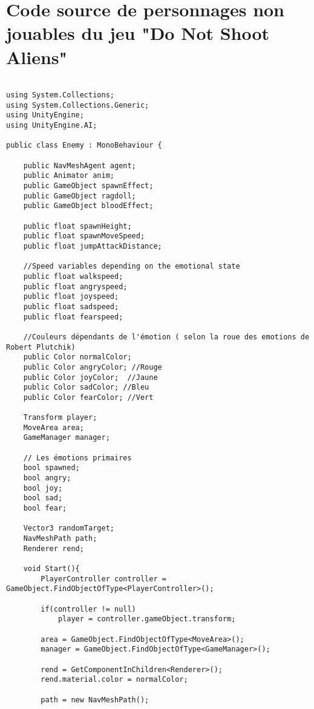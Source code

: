 
\chapter{Code source de personnages non jouables du jeu "Do Not Shoot Aliens"} %

\label{AppendixA} %


\begin{lstlisting}[language=Csh]

using System.Collections;
using System.Collections.Generic;
using UnityEngine;
using UnityEngine.AI;

public class Enemy : MonoBehaviour {
    
	public NavMeshAgent agent;
	public Animator anim;
	public GameObject spawnEffect;
	public GameObject ragdoll;
	public GameObject bloodEffect;
	
	public float spawnHeight;
	public float spawnMoveSpeed;
	public float jumpAttackDistance;

    //Speed variables depending on the emotional state
    public float walkspeed;
    public float angryspeed;
    public float joyspeed;
    public float sadspeed;
    public float fearspeed;

    //Couleurs dépendants de l'émotion ( selon la roue des emotions de Robert Plutchik)
    public Color normalColor;
    public Color angryColor; //Rouge
    public Color joyColor;  //Jaune
    public Color sadColor; //Bleu
    public Color fearColor; //Vert

    Transform player;
	MoveArea area;
	GameManager manager;

    // Les émotions primaires 
    bool spawned;
    bool angry;
    bool joy;
    bool sad;
    bool fear;

    Vector3 randomTarget;
	NavMeshPath path;
	Renderer rend;
	
	void Start(){
		PlayerController controller = GameObject.FindObjectOfType<PlayerController>();
		
		if(controller != null)
			player = controller.gameObject.transform;
		
		area = GameObject.FindObjectOfType<MoveArea>();
		manager = GameObject.FindObjectOfType<GameManager>();
		
		rend = GetComponentInChildren<Renderer>();
		rend.material.color = normalColor;
		
		path = new NavMeshPath();
	

\end{lstlisting}
